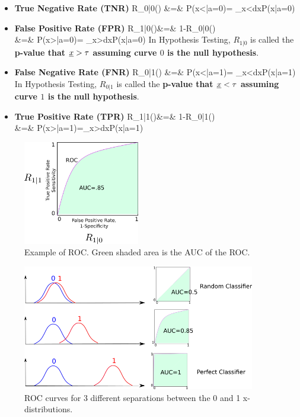 \begin{itemize}


\item{\color{blue}\bf True Negative Rate (TNR)}
\beqa
\color{blue}
R_{0|0}(\tau)
&=&
 P(x<\tau|a=0)= \int_{x<\tau}dx\;P(x|a=0)
\eeqa

\item {\color{blue}\bf False Positive Rate (FPR)}
\beqa
\color{blue}
R_{1|0}(\tau)&=&
1-R_{0|0}(\tau)
\\
&=&
P(x>\tau|a=0)= \int_{x>\tau}dx\;P(x|a=0)
\eeqa
In Hypothesis Testing,
$R_{1|0}$ is called the {\bf p-value that ${\underline{x}}>\tau$
assuming curve $0$ is the
null hypothesis}.

\item {\color{red}\bf False Negative Rate (FNR)}
\beqa
\color{red}
R_{0|1}(\tau)
&=& P(x<\tau|a=1)= \int_{x<\tau}dx\;P(x|a=1)
\eeqa
In Hypothesis Testing,
$R_{0|1}$ is called the 
{\bf p-value that ${\underline{x}}<\tau$
assuming curve $1$ is the
null hypothesis}.

\item{\color{red}\bf True Positive  Rate (TPR)}
\beqa
\color{red}
R_{1|1}(\tau)&=& 
1-R_{0|1}(\tau)
\\
&=&
P(x>\tau|a=1)=\int_{x>\tau}dx\;P(x|a=1)
\eeqa


\end{itemize}

\begin{figure}[h!]
\centering
\includegraphics[width=2in]
{roc/roc-auc.png}
\caption{Example of ROC.
Green shaded
 area is the AUC of the ROC.} 
\label{fig-roc-auc}
\end{figure}

\begin{figure}[h!]
\centering
\includegraphics[width=4in]
{roc/roc-panels.png}
\caption{
ROC curves for
3 different separations
between the 0 and 1 
x-distributions.} 
\label{fig-roc-panels}
\end{figure}



